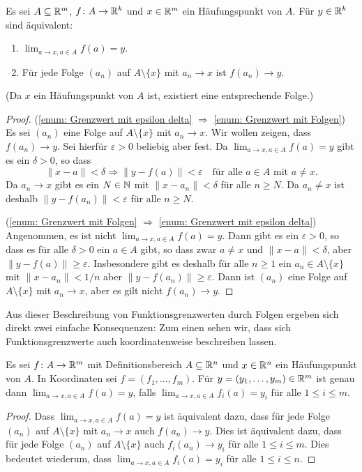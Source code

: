 \documentclass[a4paper,10pt]{article}
\begin{document}
\begin{lem}
 Es sei $A \subseteq \mathbb{R}^m$, $f \colon A \to \mathbb{R}^k$ und $x \in \mathbb{R}^m$ ein Häufungspunkt von $A$. Für $y \in \mathbb{R}^k$ sind äquivalent:
 \begin{enumerate}
  \item\label{enum: Grenzwert mit epsilon delta}
   $\lim_{a \to x, a \in A} f(a) = y$.
  \item\label{enum: Grenzwert mit Folgen}
   Für jede Folge $(a_n)$ auf $A \setminus \{x\}$ mit $a_n \to x$ ist $f(a_n) \to y$.
 \end{enumerate}
 (Da $x$ ein Häufungspunkt von $A$ ist, existiert eine entsprechende Folge.)
\end{lem}
\begin{proof}
 (\ref{enum: Grenzwert mit epsilon delta} $\Rightarrow$ \ref{enum: Grenzwert mit Folgen}) Es sei $(a_n)$ eine Folge auf $A \setminus \{x\}$ mit $a_n \to x$. Wir wollen zeigen, dass $f(a_n) \to y$. Sei hierfür $\varepsilon > 0$ beliebig aber fest. Da $\lim_{a \to x, a \in A} f(a) = y$ gibt es ein $\delta > 0$, so dass
 \[
  \|x-a\| < \delta \Rightarrow \|y-f(a)\| < \varepsilon
  \quad \text{für alle $a \in A$ mit $a \neq x$}.
 \]
 Da $a_n \to x$ gibt es ein $N \in \mathbb{N}$ mit $\|x - a_n\| < \delta$ für alle $n \geq N$. Da $a_n \neq x$ ist deshalb $\|y-f(a_n)\| < \varepsilon$ für alle $n \geq N$.
 
 (\ref{enum: Grenzwert mit Folgen} $\Rightarrow$ \ref{enum: Grenzwert mit epsilon delta}) Angenommen, es ist nicht $\lim_{a \to x, a \in A} f(a) = y$. Dann gibt es ein $\varepsilon > 0$, so dass es für alle $\delta > 0$ ein $a \in A$ gibt, so dass zwar $a \neq x$ und $\|x-a\| < \delta$, aber $\|y-f(a)\| \geq \varepsilon$. Insbesondere gibt es deshalb für alle $n \geq 1$ ein $a_n \in A \setminus \{x\}$ mit $\|x-a_n\| < 1/n$ aber $\|y-f(a_n)\| \geq \varepsilon$. Dann ist $(a_n)$ eine Folge auf $A \setminus \{x\}$ mit $a_n \to x$, aber es gilt nicht $f(a_n) \rightarrow y$.
\end{proof}


Aus dieser Beschreibung von Funktionsgrenzwerten durch Folgen ergeben sich direkt zwei einfache Konsequenzen: Zum einen sehen wir, dass sich Funktionsgrenzwerte auch koordinatenweise beschreiben lassen.


\begin{lem}
 Es sei $f \colon A \to \mathbb{R}^m$ mit Definitionsbereich $A \subseteq \mathbb{R}^n$ und $x \in \mathbb{R}^n$ ein Häufungspunkt von $A$. In Koordinaten sei $f = (f_1, \dotsc, f_m)$. Für $y = (y_1, \dotsc, y_m) \in \mathbb{R}^m$ ist genau dann $\lim_{a \to x, a \in A} f(a) = y$, falls $\lim_{a \to x, a \in A} f_i(a) = y_i$ für alle $1 \leq i \leq m$.
\end{lem}
\begin{proof}
 Dass $\lim_{a \to x, a \in A} f(a) = y$ ist äquivalent dazu, dass für jede Folge $(a_n)$ auf $A \setminus \{x\}$ mit $a_n \to x$ auch $f(a_n) \to y$. Dies ist äquivalent dazu, dass für jede Folge $(a_n)$ auf $A \setminus \{x\}$ auch $f_i(a_n) \to y_i$ für alle $1 \leq i \leq m$. Dies bedeutet wiederum, dass $\lim_{a \to x, a \in A} f_i(a) = y_i$ für alle $1 \leq i \leq n$.
\end{proof}
\end{document}
